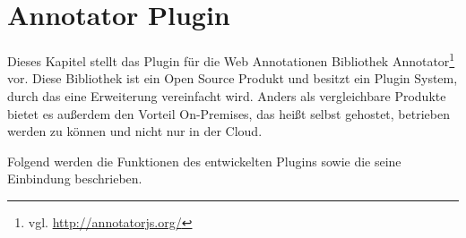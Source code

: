 \section{Annotator Plugin}
    \label{section:solutionDetailsAnnotatorPlugin}
    Dieses Kapitel stellt das Plugin für die Web Annotationen Bibliothek
    Annotator\footnote{vgl. \url{http://annotatorjs.org/}} vor.
    Diese Bibliothek ist ein Open Source Produkt und besitzt ein Plugin System,
    durch das eine Erweiterung vereinfacht wird.
    Anders als vergleichbare Produkte bietet es außerdem den Vorteil
    On-Premises, das heißt selbst gehostet, betrieben werden zu können
    und nicht nur in der Cloud.

    Folgend werden die Funktionen des entwickelten Plugins
    sowie die seine Einbindung beschrieben.

    
    